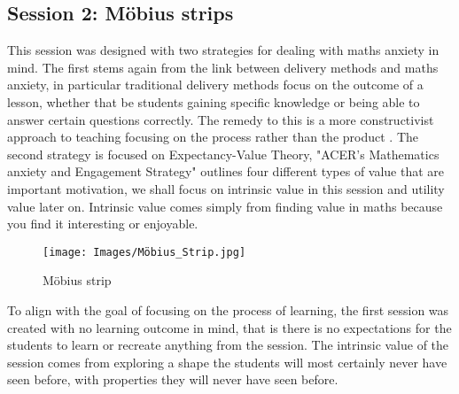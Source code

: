 \documentclass[11pt, a4paper, notitlepage]{article}
\begin{document}
\subsection{Session 2: M\"obius strips}
This session was designed with two strategies for dealing with maths anxiety in mind. The first stems again from the link between delivery methods and maths anxiety, in particular traditional delivery methods focus on the outcome of a lesson, whether that be students gaining specific knowledge or being able to answer certain questions correctly. The remedy to this is a more constructivist approach to teaching focusing on the process rather than the product \cite{Finlayson:2014}. The second strategy is focused on Expectancy-Value Theory, "ACER's Mathematics anxiety and Engagement Strategy" \cite{MAES:2024} outlines four different types of value that are important motivation, we shall focus on intrinsic value in this session and utility value later on. Intrinsic value comes simply from finding value in maths because you find it interesting or enjoyable.

\begin{wrapfigure}{r}{0.3\textwidth}
\texttt{[image: Images/Möbius\_Strip.jpg]}
\caption{M\"obius strip}
\end{wrapfigure}
\par

To align with the goal of focusing on the process of learning, the first session was created with no learning outcome in mind, that is there is no expectations for the students to learn or recreate anything from the session. The intrinsic value of the session comes from exploring a shape the students will most certainly never have seen before, with properties they will never have seen before. 

\vspace{1em}
\end{document}
